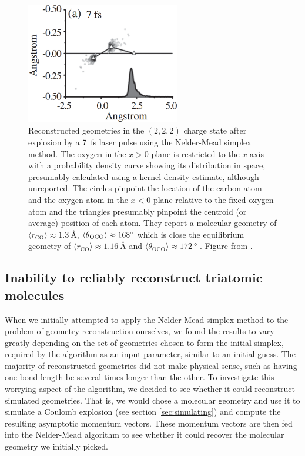 \begin{figure}
  \centering
  \includegraphics[width=0.6\textwidth]{gfx/SimplexPRL}
  \caption[Reconstructed  in the $(2,2,2)$ charge state using the Nelder-Mead simplex method.]
  {Reconstructed  geometries in the $(2,2,2)$ charge state after explosion by a \SI{7}{\fs} laser pulse using the Nelder-Mead simplex method. The oxygen in the $x>0$ plane is restricted to the $x$-axis with a probability density curve showing its distribution in space, presumably calculated using a kernel density estimate, although unreported. The circles pinpoint the location of the carbon atom and the oxygen atom in the $x<0$ plane relative to the fixed oxygen atom and the triangles presumably pinpoint the centroid (or average) position of each atom. They report a molecular geometry of $\langle r_\mathrm{CO} \rangle \approx \SI{1.3}{\angstrom}$, $\langle \theta_\mathrm{OCO} \rangle \approx 168\degree$ which is close the equilibrium geometry of $\langle r_\mathrm{CO} \rangle \approx \SI{1.16}{\angstrom}$ \citep{ChemistryOfTheElements} and $\langle \theta_\mathrm{OCO} \rangle \approx \SI{172}{\degree}$ \citep{Siegmann02, Mathur92}. Figure from \citet{Bocharova11}.}
  \label{fig:simplexPRL}
\end{figure}

\subsection{Inability to reliably reconstruct triatomic molecules} \label{ssec:simplexFail}

When we initially attempted to apply the Nelder-Mead simplex method to the problem of geometry reconstruction ourselves, we found the results to vary greatly depending on the set of geometries chosen to form the initial simplex, required by the algorithm as an input parameter, similar to an initial guess. The majority of reconstructed geometries did not make physical sense, such as having one bond length be several times longer than the other. To investigate this worrying aspect of the algorithm, we decided to see whether it could reconstruct simulated geometries. That is, we would chose a molecular geometry and use it to simulate a Coulomb explosion (see section \ref{sec:simulating}) and compute the resulting asymptotic momentum vectors. These momentum vectors are then fed into the Nelder-Mead algorithm to see whether it could recover the molecular geometry we initially picked.

